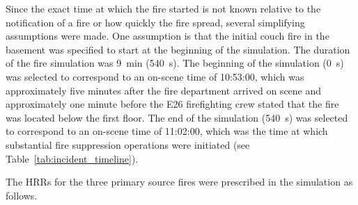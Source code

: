 \documentclass[12pt,oneside]{book}
\begin{document}
Since the exact time at which the fire started is not known relative to the notification of a fire or how quickly the fire spread, several simplifying assumptions were made. One assumption is that the initial couch fire in the basement was specified to start at the beginning of the simulation. The duration of the fire simulation was 9~min (540~s). The beginning of the simulation (0~s) was selected to correspond to an on-scene time of 10:53:00, which was approximately five minutes after the fire department arrived on scene and approximately one minute before the E26 firefighting crew stated that the fire was located below the first floor. The end of the simulation (540~s) was selected to correspond to an on-scene time of 11:02:00, which was the time at which substantial fire suppression operations were initiated (see Table~\ref{tab:incident_timeline}).

The HRRs for the three primary source fires were prescribed in the simulation as follows.
\end{document}
